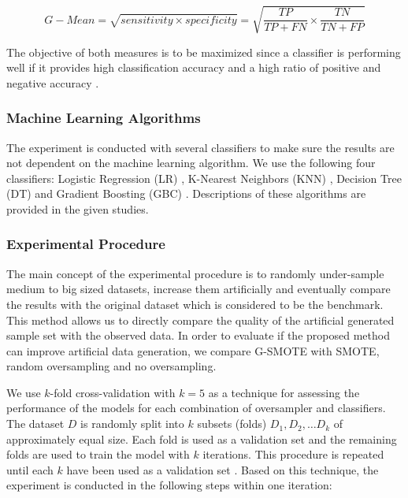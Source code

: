 \documentclass[parskip=full]{scrartcl}
\begin{document}
\[G-Mean = \sqrt{sensitivity \times specificity} = \sqrt{\dfrac{TP}{TP + FN} \times \dfrac{TN}{TN + FP}}\]

The objective of both measures is to be maximized since a classifier is performing well if it provides high classification accuracy and a high ratio of positive and negative accuracy \cite{Han.2012}. 

\subsubsection{Machine Learning Algorithms}

The experiment is conducted with several classifiers to make sure the results are not dependent on the machine learning algorithm. We use the following four classifiers: Logistic Regression (LR) \cite{McCullagh.2019}, K-Nearest Neighbors (KNN) \cite{Cover.1967}, Decision Tree (DT) \cite{Salzberg.1994} and Gradient Boosting (GBC) \cite{Friedman.2001}. Descriptions of these algorithms are provided in the given studies.

\subsubsection{Experimental Procedure}

The main concept of the experimental procedure is to randomly under-sample medium to big sized datasets, increase them artificially and eventually compare the results with the original dataset which is considered to be the benchmark. This method allows us to directly compare the quality of the artificial generated sample set with the observed data. In order to evaluate if the proposed method can improve artificial data generation, we compare G-SMOTE with SMOTE, random oversampling and no oversampling. 

We use $\mathit{k}$-fold cross-validation with $\mathit{k = 5}$ as a technique for assessing the performance of the models for each combination of oversampler and classifiers. The dataset $\mathit{D}$ is randomly split into $\mathit{k}$ subsets (folds) $\mathit{D_1, D_2, … D_k}$ of approximately equal size. Each fold is used as a validation set and the remaining folds are used to train the model with $\mathit{k}$ iterations. This procedure is repeated until each $\mathit{k}$ have been used as a validation set \cite{Han.2012}. Based on this technique, the experiment is conducted in the following steps within one iteration:
\end{document}

